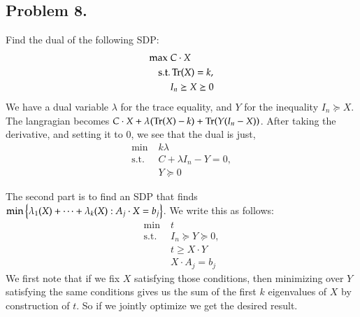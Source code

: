 \documentclass[12pt]{article}
\theoremstyle{definitionstyle}
\newcommand{\SET}[1]{\Set{\mskip-\medmuskip #1 \mskip-\medmuskip}}
\begin{document}
    \subsection*{Problem 8.}
    Find the dual of the following SDP:
    \begin{align*}
        \max \; &C \cdot X \\
        \text{s.t.} &\Tr(X) = k, \\
        &I_n \succeq X \succeq 0 
    \end{align*}
    We have a dual variable $\lambda$ for the trace equality, and $Y$ for the inequality $I_n \succeq X$. The langragian becomes $C \cdot X + \lambda(\Tr(X) - k) + \Tr(Y(I_n - X))$. After taking the derivative, and setting it to 0, we see that the dual is just,
    \begin{align*}
        \min \; &k\lambda\\
        \text{s.t.} \;&C + \lambda I_n - Y = 0, \\
        &Y \succeq 0
    \end{align*}

    The second part is to find an SDP that finds $\min\SET{\lambda_1(X)+\cdots+\lambda_k(X) : A_j \cdot X = b_j}$. We write this as follows:
    \begin{align*}
        \min \; &t \\
        \text{s.t.} \;&I_n \succeq Y \succeq 0, \\
        &t \geq X \cdot Y \\
        &X \cdot A_j = b_j
    \end{align*}
    We first note that if we fix $X$ satisfying those conditions, then minimizing over $Y$ satisfying the same conditions gives us the sum of the first $k$ eigenvalues of $X$ by construction of $t$. So if we jointly optimize we get the desired result. 
\end{document}
